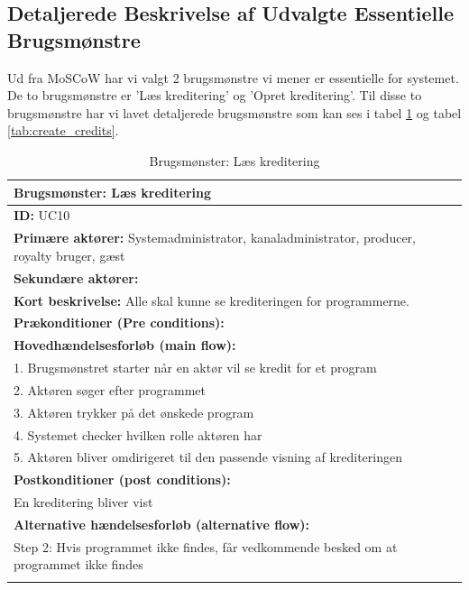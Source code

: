 \subsection{Detaljerede Beskrivelse af Udvalgte Essentielle Brugsmønstre}
Ud fra MoSCoW har vi valgt 2 brugsmønstre vi mener er essentielle for systemet. De to brugsmønstre er 'Læs kreditering' og 'Opret kreditering'. Til disse to brugsmønstre har vi lavet detaljerede brugsmønstre som kan ses i tabel \ref{table:read_credits} og tabel \ref{tab:create_credits}.

\begin{longtable}[h]{|p{16cm}|}
    \hline
    \textbf{Brugsmønster:}  Læs kreditering \\ 
    \hline
	\textbf{ID:} UC10 \\ 
	\hline
	\textbf{Primære aktører:} Systemadministrator, kanaladministrator, producer, royalty bruger, gæst \\ \hline
	\textbf{Sekundære aktører:} \\ \hline
	\textbf{Kort beskrivelse:} Alle skal kunne se krediteringen for programmerne. \\ \hline
	\textbf{Prækonditioner (Pre conditions):} \\ \hline
\textbf{Hovedhændelsesforløb (main flow):} \\
1. Brugsmønstret starter når en aktør vil se kredit for et program \\
2. Aktøren søger efter programmet \\
3. Aktøren trykker på det ønskede program \\
4. Systemet checker hvilken rolle aktøren har \\
5. Aktøren bliver omdirigeret til den passende visning af krediteringen \\ \hline
    \textbf{	Postkonditioner (post conditions):} \\
    En kreditering bliver vist \\ \hline

	\textbf{Alternative hændelsesforløb (alternative flow):} \\
Step 2: Hvis programmet ikke findes, får vedkommende besked om at programmet ikke findes \\ 
\hline
\caption{Brugsmønster: Læs kreditering}
\label{table:read_credits}
\end{longtable}

